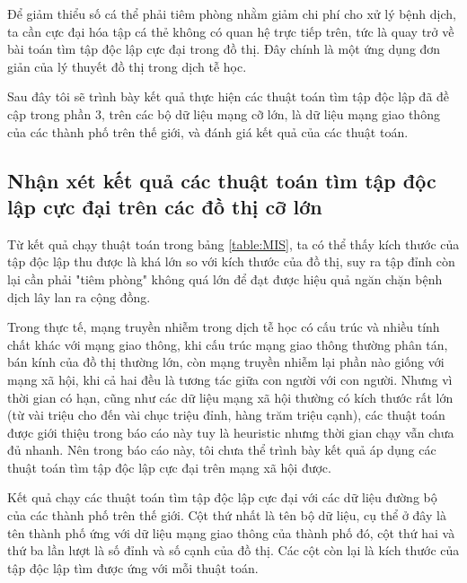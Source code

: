 \documentclass[14pt, oneside, a4paper, openany]{scrartcl}
\begin{document}
Để giảm thiểu số cá thể phải tiêm phòng nhằm giảm chi phí cho xử lý bệnh dịch, ta cần cực đại hóa tập cá thẻ không có quan hệ trực tiếp trên, tức là quay trở về bài toán tìm tập độc lập cực đại trong đồ thị.
Đây chính là một ứng dụng đơn giản của lý thuyết đồ thị trong dịch tễ học.

Sau đây tôi sẽ trình bày kết quả thực hiện các thuật toán tìm tập độc lập đã đề cập trong phần 3, trên các bộ dữ liệu mạng cỡ lớn, là dữ liệu mạng giao thông của các thành phố trên thế giới, và đánh giá kết quả của các thuật toán.

\subsection{Nhận xét kết quả các thuật toán tìm tập độc lập cực đại trên các đồ thị cỡ lớn}

Từ kết quả chạy thuật toán trong bảng \ref{table:MIS}, ta có thể thấy kích thước của tập độc lập thu được là khá lớn so với kích thước của đồ thị, suy ra tập đỉnh còn lại cần phải "tiêm phòng" không quá lớn để đạt được hiệu quả ngăn chặn bệnh dịch lây lan ra cộng đồng.

Trong thực tế, mạng truyền nhiễm trong dịch tễ học có cấu trúc và nhiều tính chất khác với mạng giao thông, khi cấu trúc mạng giao thông thường phân tán, bán kính của đồ thị thường lớn, còn mạng truyền nhiễm lại phần nào giống với mạng xã hội, khi cả hai đều là tương tác giữa con người với con người. Nhưng vì thời gian có hạn, cũng như các dữ liệu mạng xã hội thường có kích thước rất lớn (từ vài triệu cho đến vài chục triệu đỉnh, hàng trăm triệu cạnh), các thuật toán được giới thiệu trong báo cáo này tuy là heuristic nhưng thời gian chạy vẫn chưa đủ nhanh. Nên trong báo cáo này, tôi chưa thể trình bày kết quả áp dụng các thuật toán tìm tập độc lập cực đại trên mạng xã hội được.
\newpage
\begin{table}[!h]
	\caption[Kết quả chạy các thuật toán tìm tập độc lập cực đại với các dữ liệu đường bộ]{Kết quả chạy các thuật toán tìm tập độc lập cực đại với các dữ liệu đường bộ của các thành phố trên thế giới. Cột thứ nhất là tên bộ dữ liệu, cụ thể ở đây là tên thành phố ứng với dữ liệu mạng giao thông của thành phố đó, cột thứ hai và thứ ba lần lượt là số đỉnh và số cạnh của đồ thị. Các cột còn lại là kích thước của tập độc lập tìm được ứng với mỗi thuật toán.}
	\centering
	\label{table:MIS}
\end{table}

\newpage
{}
\end{document}

